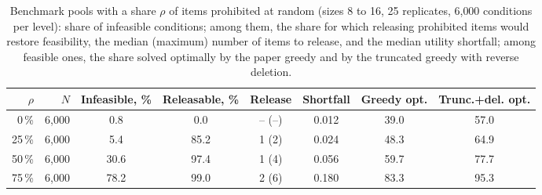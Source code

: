 \begin{table}[!htbp]
\centering
\caption{Benchmark pools with a share $\rho$ of items prohibited at random (sizes 8 to 16, 25 replicates, 6{,}000 conditions per level): share of infeasible conditions; among them, the share for which releasing prohibited items would restore feasibility, the median (maximum) number of items to release, and the median utility shortfall; among feasible ones, the share solved optimally by the paper greedy and by the truncated greedy with reverse deletion.}
\label{tab:S-admissibility}
\footnotesize
\begin{tabular}{@{}rr c ccc cc@{}}
\toprule
$\rho$ & $N$ & Infeasible, \% & Releasable, \% & Release & Shortfall & Greedy opt. & Trunc.+del. opt. \\
\midrule
0\,\% & 6,000 & 0.8 & 0.0 & -- (--) & 0.012 & 39.0 & 57.0 \\
25\,\% & 6,000 & 5.4 & 85.2 & 1 (2) & 0.024 & 48.3 & 64.9 \\
50\,\% & 6,000 & 30.6 & 97.4 & 1 (4) & 0.056 & 59.7 & 77.7 \\
75\,\% & 6,000 & 78.2 & 99.0 & 2 (6) & 0.180 & 83.3 & 95.3 \\
\bottomrule
\end{tabular}
\end{table}
